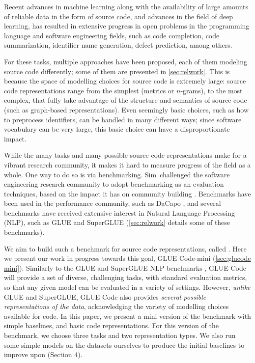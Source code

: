 \documentclass[sigplan,review,anonymous]{acmart}\settopmatter{printfolios=true,printccs=false,printacmref=false}
\begin{document}
Recent advances in machine learning along with the availability of large amounts of reliable data in the form of source code, and advances in the field of deep learning, has resulted in extensive progress in open problems in the programming language and software engineering fields, such as code completion, code summarization, identifier name generation, defect prediction, among others. %

For these tasks, multiple approaches have been proposed, each of them modeling source code differently; some of them are presented in \autoref{sec:relwork}. This is because the space of modelling choices for source code is extremely large: source code representations range from the simplest (metrics or $n$-grams), to the most complex, that fully take advantage of the structure and semantics of source code (such as graph-based representations). Even seemingly basic choices, such as how to preprocess identifiers, can be handled in many different ways; since software vocabulary can be very large, this basic choice can have a disproportionate impact. %

While the many tasks and many possible source code representations make for a vibrant research community, it makes it hard to measure progress of the field as a whole. One way to do so is via benchmarking. Sim~\etal challenged the software engineering research community to adopt benchmarking as an evaluation techniques, based on the impact it has on community building \cite{simbenchmark}. Benchmarks have been used in the performance community, such as DaCapo \cite{decapo}, and several benchmarks have received extensive interest in Natural Language Processing (NLP), such as GLUE and SuperGLUE (\autoref{sec:relwork} details some of these benchmarks). 

We aim to build such a benchmark for source code representations, called \benchmarkName. Here we present our work in progress towards this goal, GLUE Code-mini (\autoref{sec:glucode mini}). Similarly to the GLUE and SuperGLUE NLP benchmarks \citet{DBLP:journals/corr/abs-1804-07461, DBLP:journals/corr/abs-1905-00537}, GLUE Code will provide a set of diverse, challenging tasks, with standard evaluation metrics, so that any given model can be evaluated in a variety of settings. However, \emph{unlike} GLUE and SuperGLUE, GLUE Code also provides \emph{several possible representations of the data}, acknowledging the variety of modelling choices available for code.  In this paper, we present a mini version of the benchmark with simple baselines, and basic code representations. For this version of the benchmark, we choose three tasks and two representation types. We also run some simple models on the datasets ourselves to produce the initial baselines to improve upon (Section 4).  
 
\end{document}
